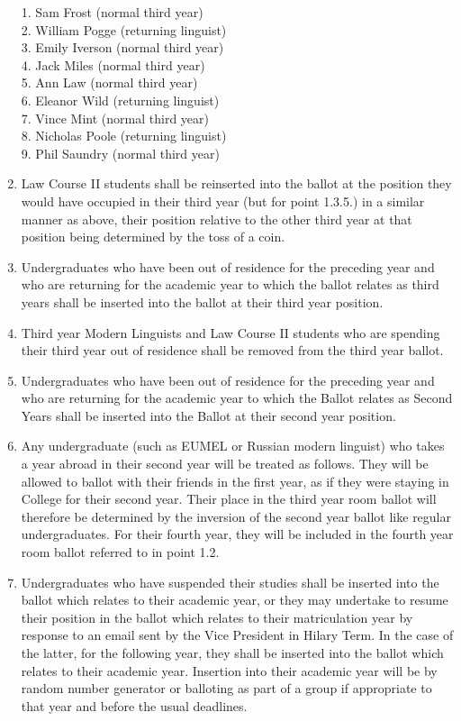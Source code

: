 \begin{enumerate}
1. Sam Frost (normal third year)\\
2. William Pogge (returning linguist)\\
3. Emily Iverson (normal third year)\\
4. Jack Miles (normal third year)\\
5. Ann Law (normal third year)\\
6. Eleanor Wild (returning linguist)\\
7. Vince Mint (normal third year)\\
8. Nicholas Poole (returning linguist)\\
9. Phil Saundry (normal third year)\\
\item Law Course II students shall be reinserted into the ballot at the position they would have occupied in their third year (but for point 1.3.5.) in a similar manner as above, their position relative to the other third year at that position being determined by the toss of a coin.
\item Undergraduates who have been out of residence for the preceding year and who are returning for the academic year to which the ballot relates as third years shall be inserted into the ballot at their third year position.
\item \label{AppP:RoomLinguist} Third year Modern Linguists and Law Course II students who are spending their third year out of residence shall be removed from the third year ballot.
\item Undergraduates who have been out of residence for the preceding year and who are returning for the academic year to which the Ballot relates as Second Years shall be inserted into the Ballot at their second year position.
\item Any undergraduate (such as EUMEL or Russian modern linguist) who takes a year abroad in their second year will be treated as follows. They will be allowed to ballot with their friends in the first year, as if they were staying in College for their second year. Their place in the third year room ballot will therefore be determined by the inversion of the second year ballot like regular undergraduates. For their fourth year, they will be included in the fourth year room ballot referred to in point 1.2.
\item Undergraduates who have suspended their studies shall be inserted into the ballot which relates to their academic year, or they may undertake to resume their position in the ballot which relates to their matriculation year by response to an email sent by the Vice President in Hilary Term. In the case of the latter, for the following year, they shall be inserted into the ballot which relates to their academic year. Insertion into their academic year will be by random number generator or balloting as part of a group if appropriate to that year and before the usual deadlines.

\end{enumerate}
